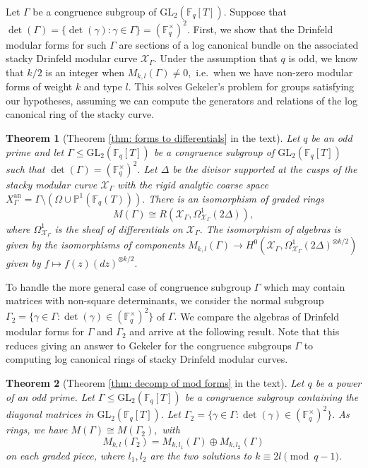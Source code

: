 \documentclass[11pt]{amsart}
\newtheorem{theorem}{Theorem}[section]
\theoremstyle{definition}
\numberwithin{equation}{section}
\newcommand{\GL}{\mathrm{GL}} 	%
\newcommand{\sX}{\mathscr{X}}		%
\newcommand{\bbF}{\mathbb{F}}		%
\newcommand{\bbP}{\mathbb{P}}		%
\begin{document}
		Let $\Gamma$ be a congruence subgroup of $\GL_2(\bbF_q[T]).$ Suppose that 
		$\displaystyle{\det(\Gamma)= \{\det(\gamma):\gamma\in \Gamma\}=(\bbF_q^{\times})^2}.$ First, we show that the Drinfeld modular forms for such $\Gamma$ are sections of a log canonical bundle on the associated stacky Drinfeld modular curve $\sX_{\Gamma}.$ Under the assumption that $q$ is odd, we know that $k/2$ is an integer when $M_{k,l}(\Gamma)\neq 0,$ i.e.\ when we have non-zero modular forms of weight $k$ and type $l.$ This solves Gekeler's problem for groups satisfying our hypotheses, assuming we can compute the generators and relations of the log canonical ring of the stacky curve.
		\begin{theorem}[Theorem \ref{thm: forms to differentials} in the text]
			Let $q$ be an odd prime and let $\Gamma\leq \GL_2(\bbF_q[T])$ be a congruence subgroup of $\GL_2(\bbF_q[T])$ such that $\det(\Gamma)=(\bbF_q^{\times})^2.$ 
			Let $\Delta$ be the divisor supported at the cusps of the stacky modular curve $\sX_{\Gamma}$ with the rigid analytic coarse space $X_{\Gamma}^{\text{an}}=\Gamma\setminus(\Omega\cup \bbP^1(\bbF_q(T))).$ 
			There is an isomorphism of graded rings \[M(\Gamma)\cong R(\sX_{\Gamma},\Omega^1_{\sX_{\Gamma}}(2\Delta)),\] where $\Omega^1_{\sX_{\Gamma}}$ is the sheaf of differentials on $\sX_{\Gamma}.$ The isomorphism of algebras is given by the isomorphisms of components $M_{k,l}(\Gamma)\to H^0(\sX_{\Gamma},\Omega^1_{\sX_{\Gamma}}(2\Delta)^{\otimes k/2})$ given by $f\mapsto f(z)(dz)^{\otimes k/2}.$ 
		\end{theorem}
		
		To handle the more general case of congruence subgroup $\Gamma$ which may contain matrices with non-square determinants, we consider the normal subgroup $\Gamma_2=\{\gamma\in \Gamma: \det(\gamma)\in (\bbF_q^{\times})^2\}$ of $\Gamma.$ We compare the algebras of Drinfeld modular forms for $\Gamma$ and $\Gamma_2$ and arrive at the following result. Note that this reduces giving an answer to Gekeler for the congruence subgroups $\Gamma$ to computing log canonical rings of stacky Drinfeld modular curves.
		\begin{theorem}[Theorem \ref{thm: decomp of mod forms} in the text]
			Let $q$ be a power of an odd prime. Let $\Gamma\leq \GL_2(\bbF_q[T])$ be a congruence subgroup containing the diagonal matrices in $\GL_2(\bbF_q[T]).$ Let $\Gamma_2=\{\gamma\in \Gamma: \det(\gamma)\in (\bbF_q^{\times})^2\}.$ As rings, we have
			$M(\Gamma)\cong M(\Gamma_2),$
			with \[M_{k,l}(\Gamma_2)=M_{k,l_1}(\Gamma)\oplus M_{k,l_2}(\Gamma)\] on each graded piece, where $l_1,l_2$ are the two solutions to $k\equiv 2l\pmod{q-1}.$ 
		\end{theorem}
		
\end{document}
